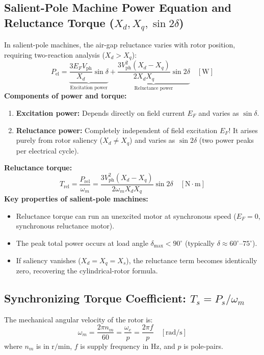 \subsection{Salient-Pole Machine Power Equation and Reluctance Torque (\texorpdfstring{$X_d, X_q, \sin 2\delta$}{Xd, Xq, sin 2delta})}
In salient-pole machines, the air-gap reluctance varies with rotor position, requiring two-reaction analysis ($X_d > X_q$):
\begin{equation}
\boxed{P_{\mathrm{el}} = \underbrace{\frac{3 E_F V_{\mathrm{ph}}}{X_d}\sin\delta}_{\text{Excitation power}} + \underbrace{\frac{3 V_{\mathrm{ph}}^2(X_d - X_q)}{2 X_d X_q}\sin 2\delta}_{\text{Reluctance power}} \quad [\mathrm{W}]}
\end{equation}
\textbf{Components of power and torque:}
\begin{enumerate}
  \item \textbf{Excitation power:} Depends directly on field current $E_F$ and varies as $\sin\delta$.
  \item \textbf{Reluctance power:} Completely independent of field excitation $E_F$! It arises purely from rotor saliency ($X_d \neq X_q$) and varies as $\sin 2\delta$ (two power peaks per electrical cycle).
\end{enumerate}
\textbf{Reluctance torque:}
\begin{equation}
\boxed{T_{\mathrm{rel}} = \frac{P_{\mathrm{rel}}}{\omega_m} = \frac{3 V_{\mathrm{ph}}^2(X_d - X_q)}{2 \omega_m X_d X_q}\sin 2\delta \quad [\mathrm{N\cdot m}]}
\end{equation}
\textbf{Key properties of salient-pole machines:}
\begin{itemize}
  \item Reluctance torque can run an unexcited motor at synchronous speed ($E_F = 0$, synchronous reluctance motor).
  \item The peak total power occurs at load angle $\delta_{\max} < 90^\circ$ (typically $\delta \approx 60^\circ\text{--}75^\circ$).
  \item If saliency vanishes ($X_d = X_q = X_s$), the reluctance term becomes identically zero, recovering the cylindrical-rotor formula.
\end{itemize}

\subsection{Synchronizing Torque Coefficient: \texorpdfstring{$T_s = P_s / \omega_m$}{Ts = Ps / omega(m)}}
The mechanical angular velocity of the rotor is:
\begin{equation}
\omega_m = \frac{2\pi n_m}{60} = \frac{\omega_e}{p} = \frac{2\pi f}{p} \quad [\mathrm{rad/s}]
\end{equation}
where $n_m$ is in $\mathrm{r/min}$, $f$ is supply frequency in $\mathrm{Hz}$, and $p$ is pole-pairs.

